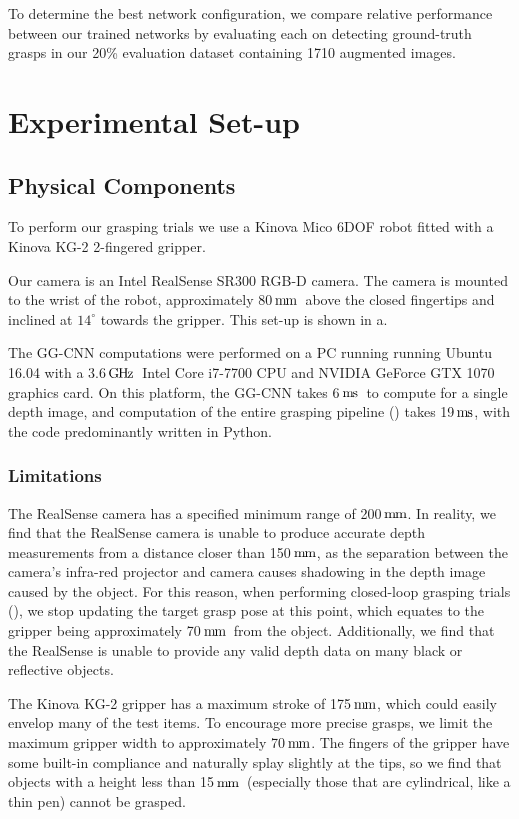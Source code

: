 \documentclass[conference]{IEEEtran}
\newcommand{\pack}	{\hspace{-0.08em}}
\newcommand{\GHz}	{\ensuremath{\rm\,G\pack H\pack z}}
\newcommand{\mm}	{\ensuremath{\rm\,m\pack m}}
\newcommand{\ms}	{\ensuremath{\rm\,m\pack s}}
\begin{document}
To determine the best network configuration, we compare relative performance between our trained networks by evaluating each on detecting ground-truth grasps in our 20\% evaluation dataset containing 1710 augmented images.  

\section{Experimental Set-up}

\subsection{Physical Components}

To perform our grasping trials we use a Kinova Mico 6DOF robot fitted with a Kinova KG-2 2-fingered gripper.

Our camera is an Intel RealSense SR300 RGB-D camera.  The camera is mounted to the wrist of the robot, approximately 80\mm~above the closed fingertips and inclined at $14^\circ$ towards the gripper.  This set-up is shown in a.

The GG-CNN computations were performed on a PC running running Ubuntu 16.04 with a 3.6\GHz~Intel Core i7-7700 CPU and NVIDIA GeForce GTX 1070 graphics card.  On this platform, the GG-CNN takes 6\ms~to compute for a single depth image, and computation of the entire grasping pipeline () takes 19\ms, with the code predominantly written in Python.

\subsubsection{Limitations}
\label{sec:limitations}

The RealSense camera has a specified minimum range of 200\mm.  In reality, we find that the RealSense camera is unable to produce accurate depth measurements from a distance closer than 150\mm, as the separation between the camera's infra-red projector and camera causes shadowing in the depth image caused by the object.  For this reason, when performing closed-loop grasping trials (), we stop updating the target grasp pose at this point, which equates to the gripper being approximately 70\mm~from the object.  Additionally, we find that the RealSense is unable to provide any valid depth data on many black or reflective objects.

The Kinova KG-2 gripper has a maximum stroke of 175\mm, which could easily envelop many of the test items. To encourage more precise grasps, we limit the maximum gripper width to approximately 70\mm.  The fingers of the gripper have some built-in compliance and naturally splay slightly at the tips, so we find that objects with a height less than 15\mm~(especially those that are cylindrical, like a thin pen) cannot be grasped.
\end{document}
